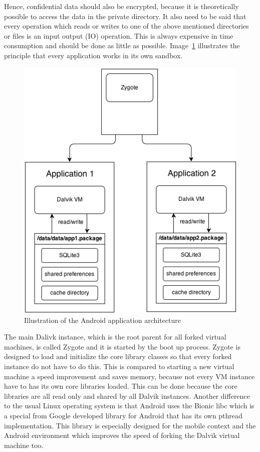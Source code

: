 Hence, confidential data should also be encrypted, because it is theoretically possible to access the data in the private directory.
It also need to be said that every operation which reads or writes to one of the above mentioned directories or files is an input output (IO) operation.
This is always expensive in time consumption and should be done as little as possible.
Image~\ref{fig:zygote-and-app} illustrates the principle that every application works in its own sandbox.\\
\begin{figure}[h]
\begin{center}
\includegraphics[scale=0.65]{images/zygote-and-app.png} 
\caption{Illustration of the Android application architecture}
\label{fig:zygote-and-app}
\end{center}
\end{figure}
The main Dalivk instance, which is the root parent for all forked virtual machines, is called Zygote and it is started by the boot up process.
Zygote is designed to load and initialize the core library classes so that every forked instance do not have to do this.
This is compared to starting a new virtual machine a speed improvement and saves memory, because not every VM instance have to has its own core libraries loaded.
This can be done because the core libraries are all read only and shared by all Dalvik instances.\cite{ehringer2010dalvik}
Another difference to the usual Linux operating system is that Android uses the Bionic libc which is a special from Google developed library for Android that has its own pthread implementation.
This library is especially designed for the mobile context and the Android environment which improves the speed of forking the Dalvik virtual machine too.~\cite{brady2008android}

